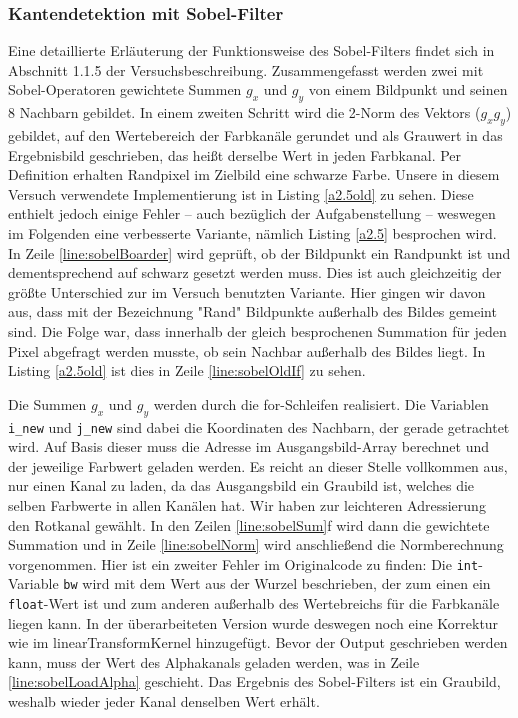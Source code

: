 \documentclass[12pt,a4paper]{scrartcl}
\begin{document}
\subsubsection{Kantendetektion mit Sobel-Filter}
Eine detaillierte Erl\"auterung der Funktionsweise des Sobel-Filters findet sich in Abschnitt 1.1.5 der Versuchsbeschreibung.
Zusammengefasst werden zwei mit Sobel-Operatoren gewichtete Summen $g_x$ und $g_y$ von einem Bildpunkt und seinen 8 Nachbarn gebildet.
In einem zweiten Schritt wird die 2-Norm des Vektors ($g_x g_y$) gebildet, auf den Wertebereich der Farbkan\"ale gerundet und als Grauwert in das Ergebnisbild geschrieben, das hei\ss t derselbe Wert in jeden Farbkanal.
Per Definition erhalten Randpixel im Zielbild eine schwarze Farbe.
Unsere in diesem Versuch verwendete Implementierung ist in Listing \ref{a2.5old} zu sehen.
Diese enthielt jedoch einige Fehler -- auch bez\"uglich der Aufgabenstellung -- weswegen im Folgenden eine verbesserte Variante, n\"amlich Listing \ref{a2.5}  besprochen wird.
In Zeile \ref{line:sobelBoarder} wird gepr\"uft, ob der Bildpunkt ein Randpunkt ist und dementsprechend auf schwarz gesetzt werden muss.
Dies ist auch gleichzeitig der gr\"o\ss{}te Unterschied zur im Versuch benutzten Variante.
Hier gingen wir davon aus, dass mit der Bezeichnung "Rand" Bildpunkte au\ss{}erhalb des Bildes gemeint sind.
Die Folge war, dass innerhalb der gleich besprochenen Summation f\"ur jeden Pixel abgefragt werden musste, ob sein Nachbar au\ss{}erhalb des Bildes liegt.
In Listing \ref{a2.5old} ist dies in Zeile \ref{line:sobelOldIf} zu sehen.

Die Summen $g_x$ und $g_y$ werden durch die for-Schleifen realisiert.
Die Variablen \texttt{i\_new} und \texttt{j\_new} sind dabei die Koordinaten des Nachbarn, der gerade getrachtet wird.
Auf Basis dieser muss die Adresse im Ausgangsbild-Array berechnet und der jeweilige Farbwert geladen werden.
Es reicht an dieser Stelle vollkommen aus, nur einen Kanal zu laden, da das Ausgangsbild ein Graubild ist, welches die selben Farbwerte in allen Kan\"alen hat.
Wir haben zur leichteren Adressierung den Rotkanal gew\"ahlt.
In den Zeilen \ref{line:sobelSum}f wird dann die gewichtete Summation und in Zeile \ref{line:sobelNorm} wird anschlie\ss end die Normberechnung vorgenommen.
Hier ist ein zweiter Fehler im Originalcode zu finden:
Die \texttt{int}-Variable \texttt{bw} wird mit dem Wert aus der Wurzel beschrieben, der zum einen ein \texttt{float}-Wert ist und zum anderen au\ss{}erhalb des Wertebreichs f\"ur die Farbkan\"ale liegen kann.
In der \"uberarbeiteten Version wurde deswegen noch eine Korrektur wie im linearTransformKernel hinzugef\"ugt.
Bevor der Output geschrieben werden kann, muss der Wert des Alphakanals geladen werden, was in Zeile \ref{line:sobelLoadAlpha} geschieht.
Das Ergebnis des Sobel-Filters ist ein Graubild, weshalb wieder jeder Kanal denselben Wert erh\"alt.
\end{document}
